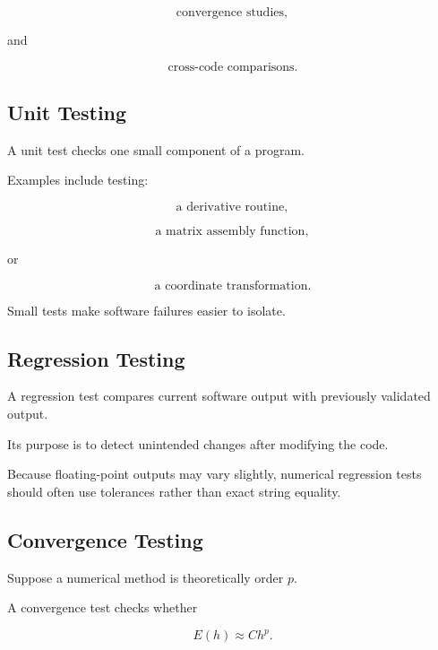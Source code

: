 \[
\boxed{
\text{convergence studies},
}
\]

and

\[
\boxed{
\text{cross-code comparisons}.
}
\]

\subsection{Unit Testing}
\label{subsec:scientific-unit-testing}

A unit test checks one small component of a program.

Examples include testing:

\[
\boxed{
\text{a derivative routine},
}
\]

\[
\boxed{
\text{a matrix assembly function},
}
\]

or

\[
\boxed{
\text{a coordinate transformation}.
}
\]

Small tests make software failures easier to isolate.

\subsection{Regression Testing}
\label{subsec:regression-testing}

A regression test compares current software output with previously
validated output.

Its purpose is to detect unintended changes after modifying the code.

Because floating-point outputs may vary slightly, numerical regression
tests should often use tolerances rather than exact string equality.

\subsection{Convergence Testing}
\label{subsec:scientific-convergence-testing}

Suppose a numerical method is theoretically order \(p\).

A convergence test checks whether

\[
\boxed{
E(h)
\approx
Ch^p.
}
\]

